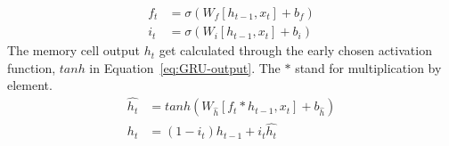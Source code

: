 \begin{equation}
    \begin{split}
        f_t &= \sigma \left (W_{f} \left [h_{t-1}, x_t \right ] + b_f \right ) \\
        i_t &= \sigma \left (W_{i} \left [h_{t-1}, x_t \right ] + b_i \right )
    \end{split}
    \label{eq:GRU-gates}
\end{equation}
The memory cell output $h_t$ get calculated through the early chosen activation function, $tanh$ in \mbox{Equation~\ref{eq:GRU-output}}.
The $\ast$ stand for multiplication by element.
\begin{equation}
    \begin{split}
        \hat{h_t} &= tanh \left (W_{\hat{h}} \left [f_t \ast h_{t-1}, x_t \right ] + b_{\hat{h}} \right ) \\
        h_t &= \left (1-i_t \right ) h_{t-1}+i_t \hat{h_t}
    \end{split}
    \label{eq:GRU-output}
\end{equation}
%
%
%
%
%

